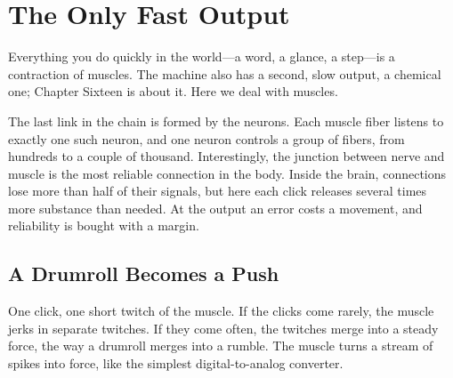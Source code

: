 \chapter{The Only Fast Output}

Everything you do quickly in the world---a word, a glance, a step---is a contraction of muscles. The machine also has a second, slow output, a chemical one; Chapter Sixteen is about it. Here we deal with muscles.

The last link in the chain is formed by the  neurons. Each muscle fiber listens to exactly one such neuron, and one neuron controls a group of fibers, from hundreds to a couple of thousand. Interestingly, the junction between nerve and muscle is the most reliable connection in the body. Inside the brain, connections lose more than half of their signals, but here each click releases several times more substance than needed. At the output an error costs a movement, and reliability is bought with a margin.

\section*{A Drumroll Becomes a Push}

One click, one short twitch of the muscle. If the clicks come rarely, the muscle jerks in separate twitches. If they come often, the twitches merge into a steady force, the way a drumroll merges into a rumble. The muscle turns a stream of spikes into force, like the simplest digital-to-analog converter.

